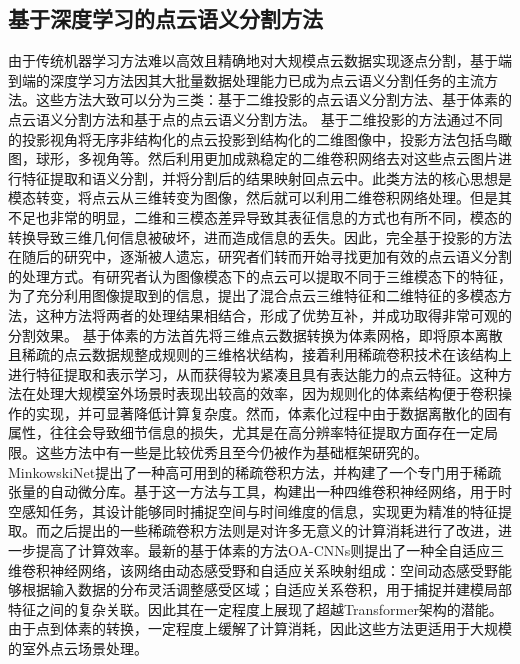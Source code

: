 \subsection{基于深度学习的点云语义分割方法}
由于传统机器学习方法难以高效且精确地对大规模点云数据实现逐点分割，基于端到端的深度学习方法因其大批量数据处理能力已成为点云语义分割任务的主流方法。这些方法大致可以分为三类：基于二维投影的点云语义分割方法、基于体素的点云语义分割方法和基于点的点云语义分割方法。
基于二维投影的方法通过不同的投影视角将无序非结构化的点云投影到结构化的二维图像中，投影方法包括鸟瞰图，球形，多视角等。然后利用更加成熟稳定的二维卷积网络去对这些点云图片进行特征提取和语义分割，并将分割后的结果映射回点云中。此类方法的核心思想是模态转变，将点云从三维转变为图像，然后就可以利用二维卷积网络处理。但是其不足也非常的明显，二维和三模态差异导致其表征信息的方式也有所不同，模态的转换导致三维几何信息被破坏，进而造成信息的丢失。因此，完全基于投影的方法在随后的研究中，逐渐被人遗忘，研究者们转而开始寻找更加有效的点云语义分割的处理方式。有研究者认为图像模态下的点云可以提取不同于三维模态下的特征，为了充分利用图像提取到的信息，提出了混合点云三维特征和二维特征的多模态方法，这种方法将两者的处理结果相结合，形成了优势互补，并成功取得非常可观的分割效果。
基于体素的方法首先将三维点云数据转换为体素网格，即将原本离散且稀疏的点云数据规整成规则的三维格状结构，接着利用稀疏卷积技术在该结构上进行特征提取和表示学习，从而获得较为紧凑且具有表达能力的点云特征。这种方法在处理大规模室外场景时表现出较高的效率，因为规则化的体素结构便于卷积操作的实现，并可显著降低计算复杂度。然而，体素化过程中由于数据离散化的固有属性，往往会导致细节信息的损失，尤其是在高分辨率特征提取方面存在一定局限。这些方法中有一些是比较优秀且至今仍被作为基础框架研究的。MinkowskiNet提出了一种高可用到的稀疏卷积方法，并构建了一个专门用于稀疏张量的自动微分库。基于这一方法与工具，构建出一种四维卷积神经网络，用于时空感知任务，其设计能够同时捕捉空间与时间维度的信息，实现更为精准的特征提取。而之后提出的一些稀疏卷积方法则是对许多无意义的计算消耗进行了改进，进一步提高了计算效率。最新的基于体素的方法OA-CNNs则提出了一种全自适应三维卷积神经网络，该网络由动态感受野和自适应关系映射组成：空间动态感受野能够根据输入数据的分布灵活调整感受区域；自适应关系卷积，用于捕捉并建模局部特征之间的复杂关联。因此其在一定程度上展现了超越Transformer架构的潜能。由于点到体素的转换，一定程度上缓解了计算消耗，因此这些方法更适用于大规模的室外点云场景处理。
